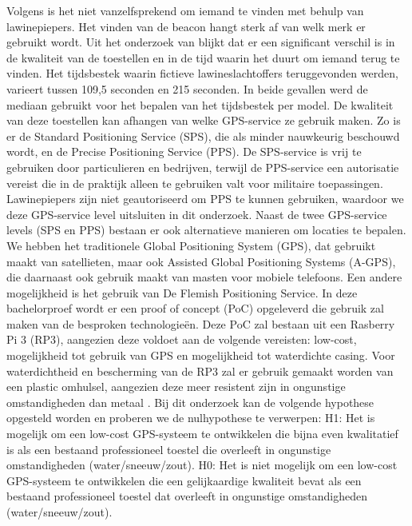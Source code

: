 Volgens \textcite{avalanche_performance} is het niet vanzelfsprekend om iemand te vinden met behulp van lawinepiepers. Het vinden van de beacon hangt sterk af van welk merk er gebruikt wordt. Uit het onderzoek van \textcite{avalanche_performance} blijkt dat er een significant verschil is in de kwaliteit van de toestellen en in de tijd waarin het duurt om iemand terug te vinden. Het tijdsbestek waarin fictieve lawineslachtoffers teruggevonden werden, varieert tussen 109,5 seconden en 215 seconden. In beide gevallen werd de mediaan gebruikt voor het bepalen van het tijdsbestek per model.
De kwaliteit van deze toestellen kan afhangen van welke GPS-service ze gebruik maken. Zo is er de Standard Positioning Service (SPS), die als minder nauwkeurig beschouwd wordt, en de Precise Positioning Service (PPS). De SPS-service is vrij te gebruiken door particulieren en bedrijven, terwijl de PPS-service een autorisatie vereist die in de praktijk alleen te gebruiken valt voor militaire toepassingen. \autocite{gps_performances} Lawinepiepers zijn niet geautoriseerd om PPS te kunnen gebruiken, waardoor we deze GPS-service level uitsluiten in dit onderzoek. 
Naast de twee GPS-service levels (SPS en PPS) bestaan er ook alternatieve manieren om locaties te bepalen. We hebben het traditionele Global Positioning System (GPS), dat gebruikt maakt van satellieten, maar ook Assisted Global Positioning Systems (A-GPS), die daarnaast ook gebruik maakt van masten voor mobiele telefoons. \autocite{a_gps_vs_gps} Een andere mogelijkheid is het gebruik van De Flemish Positioning Service.
In deze bachelorproef wordt er een proof of concept (PoC) opgeleverd die gebruik zal maken van de besproken technologieën. Deze PoC zal bestaan uit een Rasberry Pi 3 (RP3), aangezien deze voldoet aan de volgende vereisten: low-cost, mogelijkheid tot gebruik van GPS en mogelijkheid tot waterdichte casing. Voor waterdichtheid en bescherming van de RP3 zal er gebruik gemaakt worden van een plastic omhulsel,  aangezien deze meer resistent zijn in ongunstige omstandigheden dan metaal \autocite{plastic_corrosion}.
Bij dit onderzoek kan de volgende hypothese opgesteld worden en proberen we de nulhypothese te verwerpen:
H1: Het is mogelijk om een low-cost GPS-systeem te ontwikkelen die bijna even kwalitatief is als een bestaand professioneel toestel die overleeft in ongunstige omstandigheden (water/sneeuw/zout).
H0: Het is niet mogelijk om een low-cost GPS-systeem te ontwikkelen die een gelijkaardige kwaliteit bevat als een bestaand professioneel toestel dat overleeft in ongunstige omstandigheden (water/sneeuw/zout).

